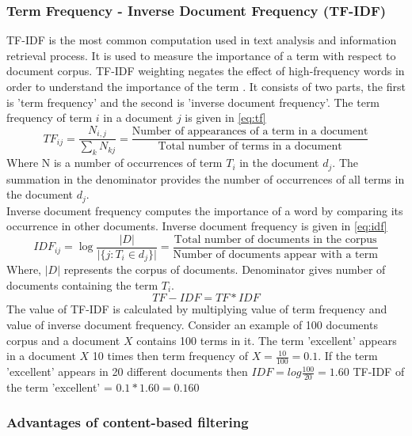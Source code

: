 \subsubsection{Term Frequency - Inverse Document Frequency (TF-IDF)}
\label{sec:tf-idf}
TF-IDF is the most common computation used in text analysis and information retrieval process. It is used to measure the importance of a term with respect to document corpus. TF-IDF weighting negates the effect of high-frequency words in order to understand the importance of the term \cite{47}. It consists of two parts, the first is 'term frequency' and the second is 'inverse document frequency'.  The term frequency of term $i$ in a document $j$ is given in \autoref{eq:tf}
\begin{equation}
TF_{ij} = \frac{N_{i,j}}{\sum_{k} N_{kj}} = \frac{\textrm{Number of appearances of a term in a document}}{\textrm{Total number of terms in a document}}
\label{eq:tf}
\end{equation}
\noindent Where N is a number of occurrences of term $T_{i}$ in the document $d_j$. The summation in the denominator provides the number of occurrences of all terms in the document $d_j$. 
\\
\noindent Inverse document frequency computes the importance of a word by comparing its occurrence in other documents. Inverse document frequency is given in \autoref{eq:idf} 
\begin{equation}
IDF_{ij} =\log  \frac{\vert D \vert}{\vert\{j:T_i \in d_j \}  \vert} = \frac{\textrm{Total number of documents in the corpus}}{\textrm{Number of documents appear with a term}}
\label{eq:idf}
\end{equation}
\noindent Where, $\vert D \vert$ represents the corpus of documents. Denominator gives number of documents containing the term $T_i$.
\\
\begin{equation}
TF-IDF = TF * IDF
\label{eq:tfidf}
\end{equation}
\noindent The value of TF-IDF is calculated by multiplying value of term frequency and value of inverse document frequency. Consider an example of 100 documents corpus and a document $X$ contains 100 terms in it. The term 'excellent' appears in a document $X$ 10 times then term frequency of $X = \frac{10}{100} = 0.1$. If the term 'excellent' appears in 20 different documents then $IDF  = log\frac{100}{20} = 1.60 $ TF-IDF of the term 'excellent' = $0.1 * 1.60 = 0.160 $


\subsubsection{Advantages of content-based filtering}

